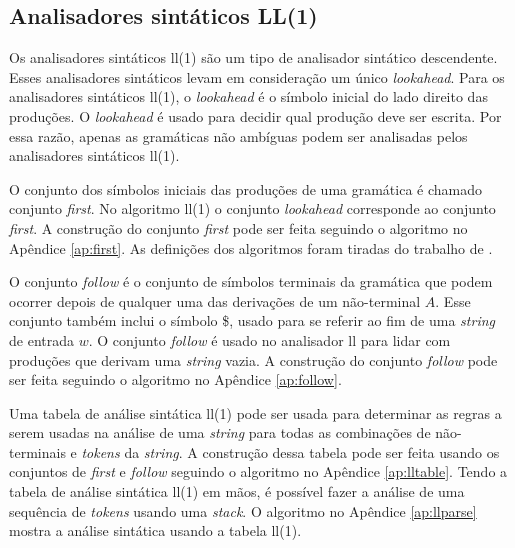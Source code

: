 \subsection{Analisadores sintáticos LL(1)}
Os analisadores sintáticos \gls{ll}(1) são um tipo de analisador sintático descendente. Esses analisadores sintáticos levam em consideração um único \textit{lookahead}. Para os analisadores sintáticos \gls{ll}(1), o \textit{lookahead} é o símbolo inicial do lado direito das produções. O \textit{lookahead} é usado para decidir qual produção deve ser escrita. Por essa razão, apenas as gramáticas não ambíguas podem ser analisadas pelos analisadores sintáticos \gls{ll}(1).


O conjunto dos símbolos iniciais das produções de uma gramática é chamado conjunto \textit{first}. No algoritmo \gls{ll}(1) o conjunto \textit{lookahead} corresponde ao conjunto \textit{first}. A construção do conjunto \textit{first} pode ser feita seguindo o algoritmo no Apêndice \ref{ap:first}. As definições dos algoritmos foram tiradas do trabalho de \textcite{thain2020introduction}.


O conjunto \textit{follow} é o conjunto de símbolos terminais da gramática que podem ocorrer depois de qualquer uma das derivações de um não-terminal $A$. Esse conjunto também inclui o símbolo \$, usado para se referir ao fim de uma \textit{string} de entrada $w$. O conjunto \textit{follow} é usado no analisador \gls{ll} para lidar com produções que derivam uma \textit{string} vazia. A construção do conjunto \textit{follow} pode ser feita seguindo o algoritmo no Apêndice \ref{ap:follow}.


Uma tabela de análise sintática \gls{ll}(1) pode ser usada para determinar as regras a serem usadas na análise de uma \textit{string} para todas as combinações de não-terminais e \textit{tokens} da \textit{string}. A construção dessa tabela pode ser feita usando os conjuntos de \textit{first} e \textit{follow} seguindo o algoritmo no Apêndice \ref{ap:lltable}. Tendo a tabela de análise sintática \gls{ll}(1) em mãos, é possível fazer a análise de uma sequência de \textit{tokens} usando uma \textit{stack}. O algoritmo no Apêndice \ref{ap:llparse} mostra a análise sintática usando a tabela \gls{ll}(1).


